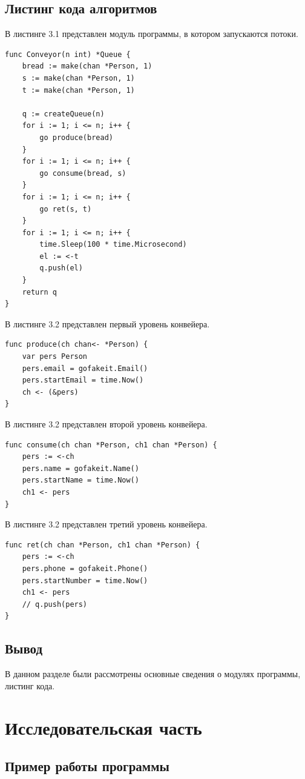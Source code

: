 \documentclass[12pt]{report}
\begin{document}
\section{Листинг кода алгоритмов}
В листинге 3.1 представлен модуль программы, в котором запускаются потоки.
\begin{lstlisting}[label=some-code,caption=Модуль запуска конвейера]
func Сonveyor(n int) *Queue {
	bread := make(chan *Person, 1)
	s := make(chan *Person, 1)
	t := make(chan *Person, 1)

	q := createQueue(n)
	for i := 1; i <= n; i++ {
		go produce(bread)
	}
	for i := 1; i <= n; i++ {
		go consume(bread, s)
	}
	for i := 1; i <= n; i++ {
		go ret(s, t)
	}
	for i := 1; i <= n; i++ {
		time.Sleep(100 * time.Microsecond)
		el := <-t
		q.push(el)
	}
	return q
}
\end{lstlisting}
В листинге 3.2 представлен первый уровень конвейера.
\begin{lstlisting}[label=some-code,caption=Первый уровень конвейера]
func produce(ch chan<- *Person) {
	var pers Person
	pers.email = gofakeit.Email()
	pers.startEmail = time.Now()
	ch <- (&pers)
}
\end{lstlisting}

В листинге 3.2 представлен второй уровень конвейера.
\begin{lstlisting}[label=some-code,caption=Второй уровень конвейера]
func consume(ch chan *Person, ch1 chan *Person) {
	pers := <-ch
	pers.name = gofakeit.Name()
	pers.startName = time.Now()
	ch1 <- pers
}
\end{lstlisting}
В листинге 3.2 представлен третий уровень конвейера.
\begin{lstlisting}[label=some-code,caption=Третий уровень конвейера]
func ret(ch chan *Person, ch1 chan *Person) {
	pers := <-ch
	pers.phone = gofakeit.Phone()
	pers.startNumber = time.Now()
	ch1 <- pers
	// q.push(pers)
}
\end{lstlisting}

\section{Вывод}
В данном разделе были рассмотрены основные сведения о модулях программы, листинг кода.


\chapter{Исследовательская часть}

\section{Пример работы программы}
\end{document}
